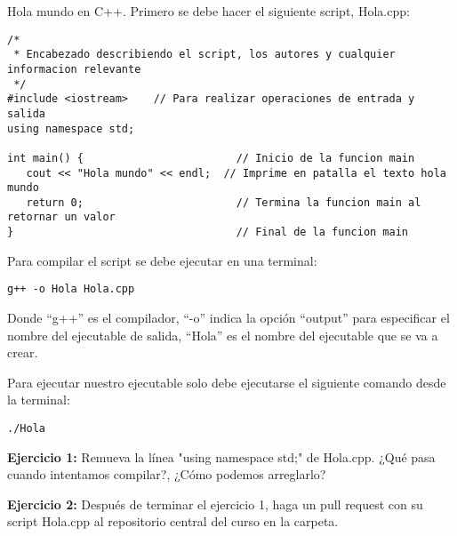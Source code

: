 \documentclass[10.5pt]{article}
\begin{document}
Hola mundo en C++. Primero se debe hacer el siguiente script, Hola.cpp:
\begin{verbatim}
/*
 * Encabezado describiendo el script, los autores y cualquier informacion relevante
 */
#include <iostream>    // Para realizar operaciones de entrada y salida
using namespace std;
 
int main() {                        // Inicio de la funcion main
   cout << "Hola mundo" << endl;  // Imprime en patalla el texto hola mundo
   return 0;                        // Termina la funcion main al retornar un valor
}                                   // Final de la funcion main
\end{verbatim}

Para compilar el script se debe ejecutar en una terminal:
\begin{verbatim}
g++ -o Hola Hola.cpp
\end{verbatim}

Donde ``g++'' es el compilador, ``-o'' indica la opción ``output'' para especificar el nombre del ejecutable de salida, ``Hola'' es el nombre del ejecutable que se va a crear.

Para ejecutar nuestro ejecutable solo debe ejecutarse el siguiente comando desde la terminal:
\begin{verbatim}
./Hola
\end{verbatim}

{\textbf{Ejercicio 1:}} Remueva la línea "using namespace std;" de Hola.cpp. ¿Qué pasa cuando intentamos compilar?, ¿Cómo podemos arreglarlo?

{\textbf{Ejercicio 2:}} Después de terminar el ejercicio 1, haga un pull request con su script Hola.cpp al repositorio central del curso en la carpeta.




%
\end{document}
